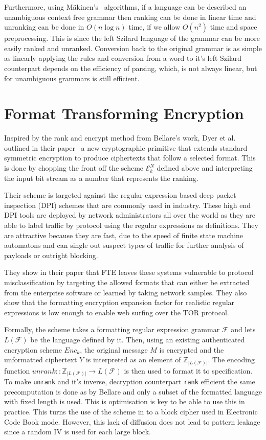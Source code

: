 \documentclass[ %
                    author={Samuel Russell},
                supervisor={Prof. Bogdan Warinschi},
                    degree={MEng},
                     title={Innocuous Ciphertexts},
                  subtitle={The DE-CENSOR Scheme},
                      type={research},
                      year={2018} ]{dissertation}
\begin{document}
Furthermore, using M\"akinen's~\cite{rankcf} algorithms, if a language can be described an unambiguous context free grammar then ranking can be done in linear time and unranking can be done in $O(n \log n)$ time, if we allow $O(n^2)$ time and space preprocessing. This is since the left Szilard language of the grammar can be more easily ranked and unranked. Conversion back to the original grammar is as simple as linearly applying the rules and conversion from a word to it's left Szilard counterpart depends on the efficiency of parsing, which, is not always linear, but for unambiguous grammars is still efficient.

\section{Format Transforming Encryption}\label{sec:FTE}

Inspired by the rank and encrypt method from Bellare's work, Dyer et al. outlined in their paper~\cite{fte} a new cryptographic primitive that extends standard symmetric encryption to produce ciphertexts that follow a selected format. This is done by chopping the front off the scheme $\mathcal{E}^N_k$ defined above and interpreting the input bit stream as a number that represents the ranking.

Their scheme is targeted against the regular expression based deep packet inspection (DPI) schemes that are commonly used in industry. These high end DPI tools are deployed by network administrators all over the world as they are able to label traffic by protocol using the regular expressions as definitions. They are attractive because they are fast, due to the speed of finite state machine automatons and can single out suspect types of traffic for further analysis of payloads or outright blocking.

They show in their paper that FTE leaves these systems vulnerable to protocol misclassification by targeting the allowed formats that can either be extracted from the enterprise software or learned by taking network samples. They also show that the formatting encryption expansion factor for realistic regular expressions is low enough to enable web surfing over the TOR protocol.

Formally, the scheme takes a formatting regular expression grammar $\mathcal{F}$ and lets $L(\mathcal{F})$ be the language defined by it. Then, using an existing authenticated encryption scheme $Enc_k$, the original message $M$ is encrypted and the unformatted ciphertext $Y$ is interpreted as an element of $\mathbb{Z}_{\vert L(\mathcal{F}) \vert}$. The encoding function $unrank :: \mathbb{Z}_{\vert L(\mathcal{F}) \vert} \rightarrow L(\mathcal{F})$ is then used to format it to specification. To make \texttt{unrank} and it's inverse, decryption counterpart \texttt{rank} efficient the same precomputation is done as by Bellare and only a subset of the formatted language with fixed length is used. This is optimisation is key to be able to use this in practice. This turns the use of the scheme in to a block cipher used in Electronic Code Book mode. However, this lack of diffusion does not lead to pattern leakage since a random IV is used for each large block.
\end{document}
